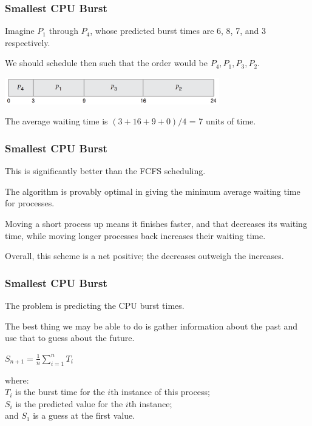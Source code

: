 \begin{frame}
\frametitle{Smallest CPU Burst}

 

Imagine $P_{1}$ through $P_{4}$, whose predicted burst times are 6, 8, 7, and 3 respectively. 

We should schedule then such that the order would be $P_{4}, P_{1}, P_{3}, P_{2}$.

\begin{center}
\includegraphics[width=0.7\textwidth]{images/sjf.png}
\end{center}

The average waiting time is $(3 + 16 + 9 + 0) / 4$ = 7 units of time. 

\end{frame}

\begin{frame}
\frametitle{Smallest CPU Burst}

This is significantly better than the FCFS scheduling. 

The algorithm is provably optimal in giving the minimum average waiting time for processes. 

Moving a short process up means it finishes faster, and that decreases its waiting time, while moving longer processes back increases their waiting time. 

Overall, this scheme is a net positive; the decreases outweigh the increases.

\end{frame}

\begin{frame}
\frametitle{Smallest CPU Burst}

The problem is predicting the CPU burst times. 

The best thing we may be able to do is gather information about the past and use that to guess about the future. 

\begin{center}
$S_{n+1} = \frac{1}{n}\displaystyle\sum_{i=1}^{n}T_{i}$
\end{center}

where:\\
\quad $T_{i}$ is the burst time for the $i$th instance of this process;\\
\quad $S_{i}$ is the predicted value for the $i$th instance; \\
\quad and $S_{1}$ is a guess at the first value.

\end{frame}

